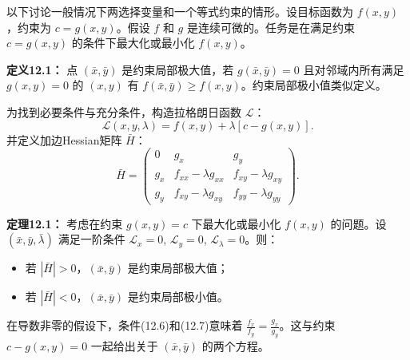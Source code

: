 \begin{translation}
以下讨论一般情况下两选择变量和一个等式约束的情形。设目标函数为 $f(x, y)$，约束为 $c = g(x, y)$。假设 $f$ 和 $g$ 是连续可微的。任务是在满足约束 $c = g(x, y)$ 的条件下最大化或最小化 $f(x, y)$。

\textbf{定义12.1：} 点 $(\bar{x}, \bar{y})$ 是约束局部极大值，若 $g(\bar{x}, \bar{y}) = 0$ 且对邻域内所有满足 $g(x, y) = 0$ 的 $(x, y)$ 有 $f(\bar{x}, \bar{y}) \geq f(x, y)$。约束局部极小值类似定义。

为找到必要条件与充分条件，构造拉格朗日函数 $\mathcal{L}$：
\[
\mathcal{L}(x, y, \lambda) = f(x, y) + \lambda[c - g(x, y)]. \tag{12.4}
\]
并定义加边Hessian矩阵 $\bar{H}$：
\[
\bar{H} = \begin{pmatrix}
0 & g_x & g_y \\
g_x & f_{xx} - \lambda g_{xx} & f_{xy} - \lambda g_{xy} \\
g_y & f_{xy} - \lambda g_{xy} & f_{yy} - \lambda g_{yy}
\end{pmatrix}. \tag{12.5}
\]

\textbf{定理12.1：} 考虑在约束 $g(x, y) = c$ 下最大化或最小化 $f(x, y)$ 的问题。设 $(\bar{x}, \bar{y}, \bar{\lambda})$ 满足一阶条件 $\mathcal{L}_x = 0$, $\mathcal{L}_y = 0$, $\mathcal{L}_\lambda = 0$。则：
\begin{itemize}
\item 若 $|\bar{H}| > 0$，$(\bar{x}, \bar{y})$ 是约束局部极大值；
\item 若 $|\bar{H}| < 0$，$(\bar{x}, \bar{y})$ 是约束局部极小值。
\end{itemize}

在导数非零的假设下，条件(12.6)和(12.7)意味着 $\frac{f_x}{f_y} = \frac{g_x}{g_y}$。这与约束 $c - g(x, y) = 0$ 一起给出关于 $(\bar{x}, \bar{y})$ 的两个方程。
\end{translation}

